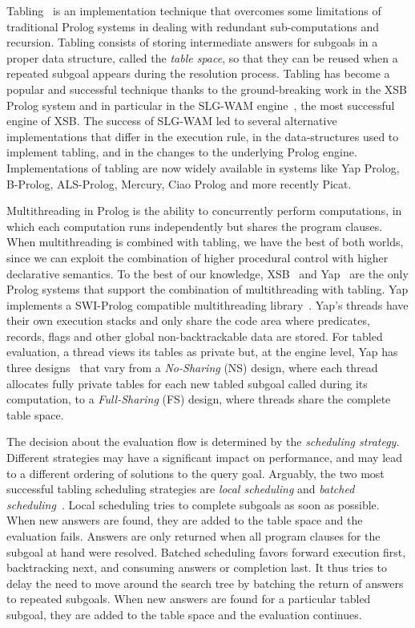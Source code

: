 \documentclass{llncs}
\begin{document}
Tabling~\cite{Chen-96} is an implementation technique that overcomes
some limitations of traditional Prolog systems in dealing with
redundant sub-computations and recursion. Tabling consists of storing
intermediate answers for subgoals in a proper data structure, called
the \emph{table space}, so that they can be reused when a repeated
subgoal appears during the resolution process. Tabling has become a
popular and successful technique thanks to the ground-breaking work in
the XSB Prolog system and in particular in the SLG-WAM
engine~\cite{Sagonas-98}, the most successful engine of XSB. The
success of SLG-WAM led to several alternative implementations that
differ in the execution rule, in the data-structures used to implement
tabling, and in the changes to the underlying Prolog
engine. Implementations of tabling are now widely available in systems
like Yap Prolog, B-Prolog, ALS-Prolog, Mercury, Ciao Prolog and more
recently Picat.

Multithreading in Prolog is the ability to concurrently perform
computations, in which each computation runs independently but shares
the program clauses. When multithreading is combined with tabling, we
have the best of both worlds, since we can exploit the combination of
higher procedural control with higher declarative semantics. To the
best of our knowledge, XSB~\cite{Marques-08} and Yap~\cite{Areias-12a}
are the only Prolog systems that support the combination of
multithreading with tabling. Yap implements a SWI-Prolog compatible
multithreading library~\cite{Wielemaker-03}. Yap's threads have their
own execution stacks and only share the code area where predicates,
records, flags and other global non-backtrackable data are stored. For
tabled evaluation, a thread views its tables as private but, at the
engine level, Yap has three designs~\cite{Areias-12a} that vary from a
\emph{No-Sharing} (NS) design, where each thread allocates fully
private tables for each new tabled subgoal called during its
computation, to a \emph{Full-Sharing} (FS) design, where threads share
the complete table space.

The decision about the evaluation flow is determined by the
\emph{scheduling strategy}. Different strategies may have a
significant impact on performance, and may lead to a different
ordering of solutions to the query goal. Arguably, the two most
successful tabling scheduling strategies are \emph{local scheduling}
and \emph{batched scheduling}~\cite{Freire-96}. Local scheduling tries
to complete subgoals as soon as possible. When new answers are found,
they are added to the table space and the evaluation fails. Answers
are only returned when all program clauses for the subgoal at hand
were resolved. Batched scheduling favors forward execution first,
backtracking next, and consuming answers or completion last. It thus
tries to delay the need to move around the search tree by batching the
return of answers to repeated subgoals. When new answers are found for
a particular tabled subgoal, they are added to the table space and the
evaluation continues.
\end{document}
